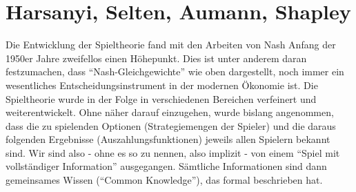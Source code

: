 \section{Harsanyi, Selten, Aumann, Shapley}

Die Entwicklung der Spieltheorie fand mit den Arbeiten von Nash Anfang der 1950er Jahre zweifellos einen Höhepunkt. Dies ist unter anderem daran festzumachen, dass "`Nash-Gleichgewichte"' wie oben dargestellt, noch immer ein wesentliches Entscheidungsinstrument in der modernen Ökonomie ist. Die Spieltheorie wurde in der Folge in verschiedenen Bereichen verfeinert und weiterentwickelt. Ohne näher darauf einzugehen, wurde bislang angenommen, dass die zu spielenden Optionen (Strategiemengen der Spieler) und die daraus folgenden Ergebnisse (Auszahlungsfunktionen) jeweils allen Spielern bekannt sind. Wir sind also - ohne es so zu nennen, also implizit - von einem "`Spiel mit vollständiger Information"' ausgegangen. Sämtliche Informationen sind dann gemeinsames Wissen ("`Common Knowledge"'), das \textcite{Aumann1976} formal beschrieben hat.

